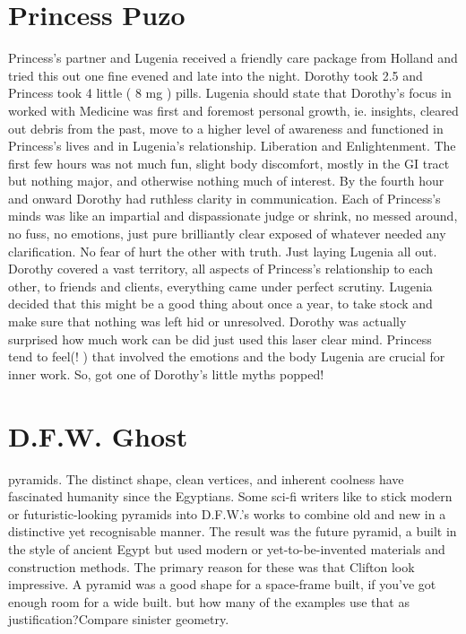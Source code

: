 \documentclass[12pt]{book}
\begin{document}
\chapter{Princess Puzo}

Princess's partner and Lugenia received a friendly care package from Holland and tried this out one fine evened and late into the night. Dorothy took 2.5 and Princess took 4 little ( 8 mg ) pills. Lugenia should state that Dorothy's focus in worked with Medicine was first and foremost personal growth, ie. insights, cleared out debris from the past, move to a higher level of awareness and functioned in Princess's lives and in Lugenia's relationship. Liberation and Enlightenment. The first few hours was not much fun, slight body discomfort, mostly in the GI tract but nothing major, and otherwise nothing much of interest. By the fourth hour and onward Dorothy had ruthless clarity in communication. Each of Princess's minds was like an impartial and dispassionate judge or shrink, no messed around, no fuss, no emotions, just pure brilliantly clear exposed of whatever needed any clarification. No fear of hurt the other with truth. Just laying Lugenia all out. Dorothy covered a vast territory, all aspects of Princess's relationship to each other, to friends and clients, everything came under perfect scrutiny. Lugenia decided that this might be a good thing about once a year, to take stock and make sure that nothing was left hid or unresolved. Dorothy was actually surprised how much work can be did just used this laser clear mind. Princess tend to feel(! ) that involved the emotions and the body Lugenia are crucial for inner work. So, got one of Dorothy's little myths popped!






\chapter{D.F.W. Ghost}

pyramids. The distinct shape, clean vertices, and inherent coolness have fascinated humanity since the Egyptians. Some sci-fi writers like to stick modern or futuristic-looking pyramids into D.F.W.'s works to combine old and new in a distinctive yet recognisable manner. The result was the future pyramid, a built in the style of ancient Egypt but used modern or yet-to-be-invented materials and construction methods. The primary reason for these was that Clifton look impressive. A pyramid was a good shape for a space-frame built, if you've got enough room for a wide built. but how many of the examples use that as justification?Compare sinister geometry.
\end{document}
